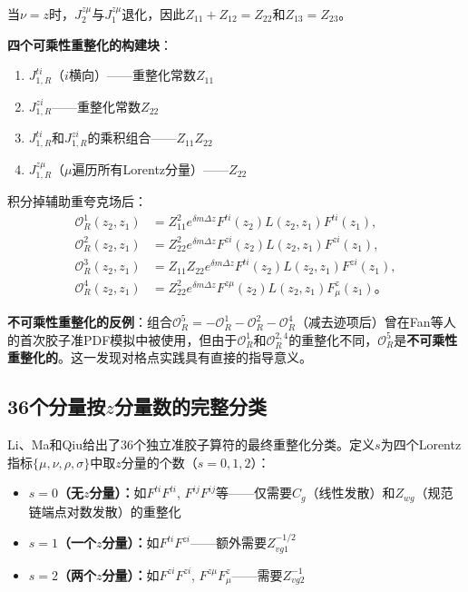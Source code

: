 \documentclass[12pt,a4paper]{ctexart}
\theoremstyle{definition}
\begin{document}
当$\nu = z$时，$J^{z\mu}_2$与$J^{z\mu}_1$退化，因此$Z_{11}+Z_{12}=Z_{22}$和$Z_{13}=Z_{23}$\cite{Zhang2019}。

\textbf{四个可乘性重整化的构建块}\cite{Zhang2019}：
\begin{enumerate}
    \item $J^{ti}_{1,R}$（$i$横向）——重整化常数$Z_{11}$
    \item $J^{zi}_{1,R}$——重整化常数$Z_{22}$
    \item $J^{ti}_{1,R}$和$J^{zi}_{1,R}$的乘积组合——$Z_{11}Z_{22}$
    \item $J^{z\mu}_{1,R}$（$\mu$遍历所有Lorentz分量）——$Z_{22}$
\end{enumerate}

积分掉辅助重夸克场后\cite{Zhang2019}：
\begin{equation}
\begin{aligned}
\mathcal{O}^1_R(z_2, z_1) &= Z^2_{11} e^{\delta m \Delta z} F^{ti}(z_2) L(z_2, z_1) F^{ti}(z_1), \\
\mathcal{O}^2_R(z_2, z_1) &= Z^2_{22} e^{\delta m \Delta z} F^{zi}(z_2) L(z_2, z_1) F^{zi}(z_1), \\
\mathcal{O}^3_R(z_2, z_1) &= Z_{11}Z_{22} e^{\delta m \Delta z} F^{ti}(z_2) L(z_2, z_1) F^{zi}(z_1), \\
\mathcal{O}^4_R(z_2, z_1) &= Z^2_{22} e^{\delta m \Delta z} F^{z\mu}(z_2) L(z_2, z_1) F^z_\mu(z_1)。
\end{aligned}
\label{eq:four_building_blocks}
\end{equation}

\textbf{不可乘性重整化的反例}\cite{Zhang2019}：组合$\mathcal{O}^5_R = -\mathcal{O}^1_R - \mathcal{O}^2_R - \mathcal{O}^4_R$（减去迹项后）曾在Fan等人的首次胶子准PDF模拟中被使用\cite{Fan2018gluon}，但由于$\mathcal{O}^1_R$和$\mathcal{O}^{2,4}_R$的重整化不同，$\mathcal{O}^5_R$是\textbf{不可乘性重整化的}。这一发现对格点实践具有直接的指导意义。

\subsection{36个分量按$z$分量数的完整分类}

Li、Ma和Qiu\cite{Li2018multiplicative}给出了36个独立准胶子算符的最终重整化分类。定义$s$为四个Lorentz指标$\{\mu,\nu,\rho,\sigma\}$中取$z$分量的个数（$s=0,1,2$）：
\begin{itemize}
    \item \textbf{$s=0$（无$z$分量）：}如$F^{ti}F^{ti}$, $F^{ij}F^{ij}$等——仅需要$C_g$（线性发散）和$Z_{wg}$（规范链端点对数发散）的重整化
    \item \textbf{$s=1$（一个$z$分量）：}如$F^{ti}F^{zi}$——额外需要$Z^{-1/2}_{vg1}$
    \item \textbf{$s=2$（两个$z$分量）：}如$F^{zi}F^{zi}$, $F^{z\mu}F^z_\mu$——需要$Z^{-1}_{vg2}$
\end{itemize}
\end{document}
